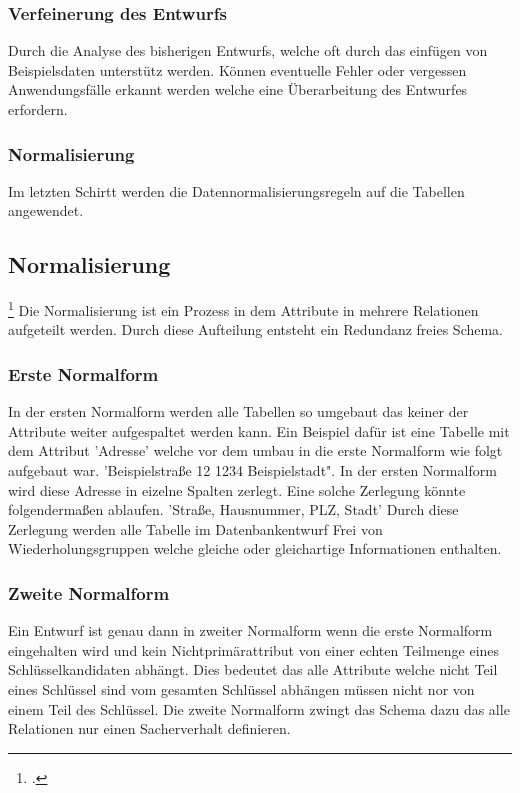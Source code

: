 			\subsubsection*{Verfeinerung des Entwurfs}
				Durch die Analyse des bisherigen Entwurfs, welche oft durch das einfügen von Beispielsdaten unterstütz werden. Können eventuelle Fehler oder vergessen Anwendungsfälle erkannt werden welche eine Überarbeitung des Entwurfes erfordern. 
			\subsubsection*{Normalisierung}
				Im letzten Schirtt werden die Datennormalisierungsregeln auf die Tabellen angewendet. 
		
		\subsection*{Normalisierung}\footcite{normalisierung}
			Die Normalisierung ist ein Prozess in dem Attribute in mehrere Relationen aufgeteilt werden. Durch diese Aufteilung entsteht ein Redundanz freies Schema.

			\subsubsection*{Erste Normalform}
				In der ersten Normalform werden alle Tabellen so umgebaut das keiner der Attribute weiter aufgespaltet werden kann. 
					Ein Beispiel dafür ist eine Tabelle mit dem Attribut 'Adresse' welche vor dem umbau in die erste Normalform wie folgt aufgebaut war.
					'Beispielstraße 12 1234 Beispielstadt". In der ersten Normalform wird diese Adresse in eizelne Spalten zerlegt. Eine solche Zerlegung könnte folgendermaßen ablaufen.
					'Straße, Hausnummer, PLZ, Stadt'
				Durch diese Zerlegung werden alle Tabelle im Datenbankentwurf Frei von Wiederholungsgruppen welche gleiche oder gleichartige Informationen enthalten.
			
			\subsubsection*{Zweite Normalform}
				Ein Entwurf ist genau dann in zweiter Normalform wenn die erste Normalform eingehalten wird und kein Nichtprimärattribut von einer echten Teilmenge eines Schlüsselkandidaten abhängt.
				Dies bedeutet das alle Attribute welche nicht Teil eines Schlüssel sind vom gesamten Schlüssel abhängen müssen nicht nor von einem Teil des Schlüssel. 
				Die zweite Normalform zwingt das Schema dazu das alle Relationen nur einen Sacherverhalt definieren.
			
